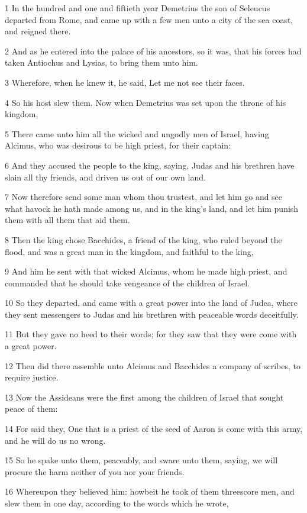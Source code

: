 \par 1 In the hundred and one and fiftieth year Demetrius the son of Seleucus departed from Rome, and came up with a few men unto a city of the sea coast, and reigned there.
\par 2 And as he entered into the palace of his ancestors, so it was, that his forces had taken Antiochus and Lysias, to bring them unto him.
\par 3 Wherefore, when he knew it, he said, Let me not see their faces.
\par 4 So his host slew them. Now when Demetrius was set upon the throne of his kingdom,
\par 5 There came unto him all the wicked and ungodly men of Israel, having Alcimus, who was desirous to be high priest, for their captain:
\par 6 And they accused the people to the king, saying, Judas and his brethren have slain all thy friends, and driven us out of our own land.
\par 7 Now therefore send some man whom thou trustest, and let him go and see what havock he hath made among us, and in the king's land, and let him punish them with all them that aid them.
\par 8 Then the king chose Bacchides, a friend of the king, who ruled beyond the flood, and was a great man in the kingdom, and faithful to the king,
\par 9 And him he sent with that wicked Alcimus, whom he made high priest, and commanded that he should take vengeance of the children of Israel.
\par 10 So they departed, and came with a great power into the land of Judea, where they sent messengers to Judas and his brethren with peaceable words deceitfully.
\par 11 But they gave no heed to their words; for they saw that they were come with a great power.
\par 12 Then did there assemble unto Alcimus and Bacchides a company of scribes, to require justice.
\par 13 Now the Assideans were the first among the children of Israel that sought peace of them:
\par 14 For said they, One that is a priest of the seed of Aaron is come with this army, and he will do us no wrong.
\par 15 So he spake unto them, peaceably, and sware unto them, saying, we will procure the harm neither of you nor your friends.
\par 16 Whereupon they believed him: howbeit he took of them threescore men, and slew them in one day, according to the words which he wrote,
